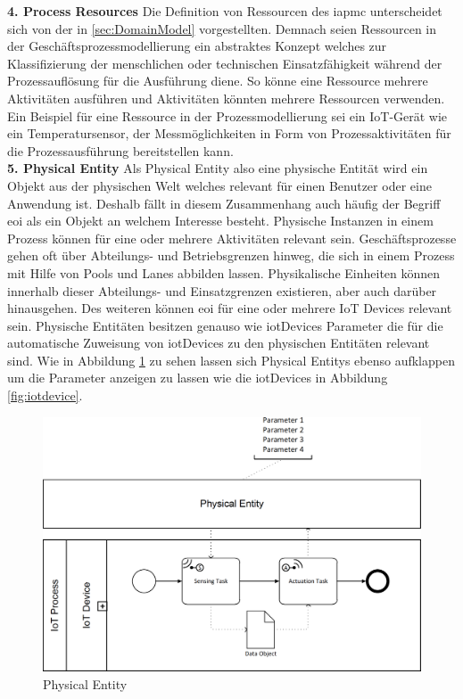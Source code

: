\documentclass[a4paper, 12pt, twoside, headsepline=true]{scrartcl} %
\begin{document}
\textbf{4. Process Resources}
\newline
Die Definition von Ressourcen des \ac{iapmc} unterscheidet sich von der in \ref{sec:DomainModel} vorgestellten. Demnach seien Ressourcen in der Geschäftsprozessmodellierung ein abstraktes Konzept welches zur Klassifizierung der menschlichen oder technischen Einsatzfähigkeit während der Prozessauflösung für die Ausführung diene. So könne eine Ressource mehrere Aktivitäten ausführen und Aktivitäten könnten mehrere Ressourcen verwenden. Ein Beispiel für eine Ressource in der Prozessmodellierung sei ein IoT-Gerät wie ein Temperatursensor, der Messmöglichkeiten in Form von Prozessaktivitäten für die Prozessausführung bereitstellen kann\cite[S.54]{conceptsiotawarepm}. %
\\

\textbf{5. Physical Entity}
\newline
Als Physical Entity also eine physische Entität wird ein Objekt aus der physischen Welt welches relevant für einen Benutzer oder eine Anwendung ist. Deshalb fällt in diesem Zusammenhang auch häufig der Begriff \acl{eoi} als ein Objekt an welchem Interesse besteht. Physische Instanzen in einem Prozess können für eine oder mehrere Aktivitäten relevant sein. Geschäftsprozesse gehen oft über Abteilungs- und Betriebsgrenzen hinweg, die sich in einem Prozess mit Hilfe von Pools und Lanes abbilden lassen. Physikalische Einheiten können innerhalb dieser Abteilungs- und Einsatzgrenzen existieren, aber auch darüber hinausgehen. Des weiteren können \ac{eoi} für eine oder mehrere \ac{IoT} Devices relevant sein\cite[S.58-59]{conceptsiotawarepm}. Physische Entitäten besitzen genauso wie \ac{iot}Devices Parameter die für die automatische Zuweisung von \ac{iot}Devices zu den physischen Entitäten relevant sind. Wie in Abbildung \ref{fig:physicalentity} zu sehen lassen sich Physical Entitys ebenso aufklappen um die Parameter anzeigen zu lassen wie die \ac{iot}Devices in Abbildung \ref{fig:iotdevice}. 

\begin{figure}[H]
	\includegraphics[height=8 cm,keepaspectratio,center]{figures/PhysicalEntity}
	\caption{Physical Entity \cite[S.62]{conceptsiotawarepm}}
	\label{fig:physicalentity}
\end{figure} 
\end{document}

